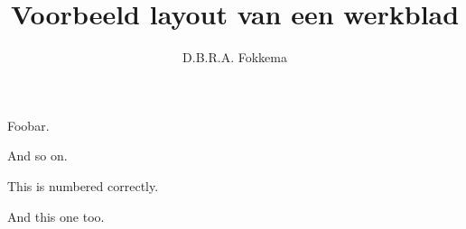 

\usepackage{lipsum}

\title{Voorbeeld layout van een werkblad}
\author{D.B.R.A. Fokkema}



\maketitle

\begin{questions}


\question \lipsum[1]

\question Foobar.

\question And so on.



\question This is numbered correctly.


\question And this one too.


\end{questions}

